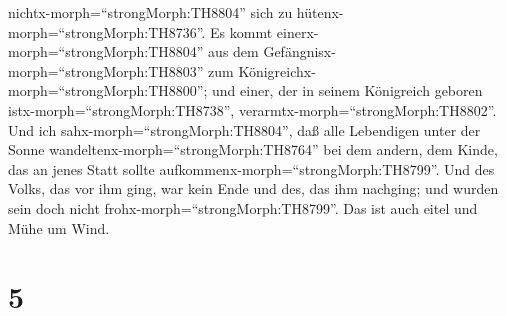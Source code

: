nichtx-morph=``strongMorph:TH8804'' sich zu
hütenx-morph=``strongMorph:TH8736''.  Es kommt
einerx-morph=``strongMorph:TH8804'' aus dem
Gefängnisx-morph=``strongMorph:TH8803'' zum
Königreichx-morph=``strongMorph:TH8800''; und einer, der in seinem
Königreich geboren istx-morph=``strongMorph:TH8738'',
verarmtx-morph=``strongMorph:TH8802''.  Und ich
sahx-morph=``strongMorph:TH8804'', daß alle Lebendigen unter der Sonne
wandeltenx-morph=``strongMorph:TH8764'' bei dem andern, dem Kinde, das
an jenes Statt sollte aufkommenx-morph=``strongMorph:TH8799''.
 Und des Volks, das vor ihm ging, war kein Ende und des,
das ihm nachging; und wurden sein doch nicht
frohx-morph=``strongMorph:TH8799''. Das ist auch eitel und Mühe um Wind.

\hypertarget{section-4}{%
\section{5}\label{section-4}}

